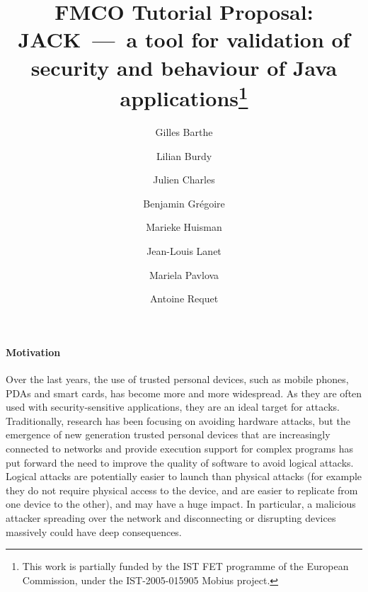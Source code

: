 \documentclass[]{llncs}
\title{FMCO Tutorial Proposal:\\
JACK~---~a tool for validation of security and behaviour of Java
applications\thanks{This work is partially funded by the IST FET
programme of the European Commission, under the IST-2005-015905
\textsf{Mobius} project.}}
\author{Gilles Barthe\inst{1} \and
        Lilian Burdy\inst{2} \and
        Julien Charles\inst{1} \and
        Benjamin Gr\'egoire\inst{1} \and
        Marieke Huisman\inst{1} \and
        Jean-Louis Lanet\inst{3} \and
        Mariela Pavlova\inst{1} \and
        Antoine Requet\inst{3}}
\institute{INRIA Sophia Antipolis, France \and ClearSy, France \and
gemalto, France}
\begin{document}
\maketitle




\paragraph{Motivation}
Over the last years, the use of trusted personal devices, such as
mobile phones, PDAs and smart cards, has become more and more
widespread. As they are often used with security-sensitive
applications, they are an ideal target for attacks. Traditionally,
research has been focusing on avoiding hardware attacks, but the
emergence of new generation trusted personal devices that are
increasingly connected to networks and provide execution support for
complex programs has put forward the need to improve the quality of
software to avoid logical attacks.  Logical attacks are potentially
easier to launch than physical attacks (for example they do not
require physical access to the device, and are easier to replicate
from one device to the other), and may have a huge impact.  In
particular, a malicious attacker spreading over the network and
disconnecting or disrupting devices massively could have deep
consequences.
\end{document}
